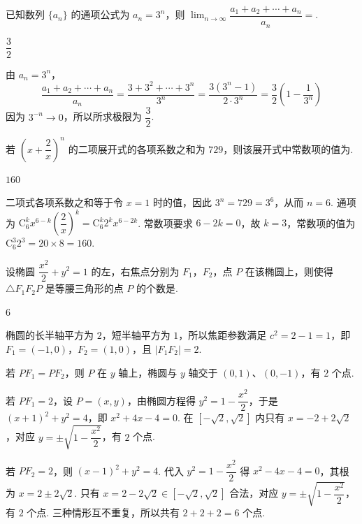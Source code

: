 \begin{problem}
已知数列 \(\{a_n\}\) 的通项公式为 \(a_n=3^n\)，则 \(\displaystyle\lim_{n\to\infty}\dfrac{a_1+a_2+\cdots+a_n}{a_n}=\)\fillinblank{}.
\end{problem}

\begin{answer}
\(\dfrac32\)
\end{answer}

\begin{solution}
由 \(a_n=3^n\)，
\[
\frac{a_1+a_2+\cdots+a_n}{a_n}=\frac{3+3^2+\cdots+3^n}{3^n}=\frac{3(3^n-1)}{2\cdot3^n}=\frac32\left(1-\frac1{3^n}\right)
\]
因为 \(3^{-n}\to0\)，所以所求极限为 \(\dfrac32\).
\end{solution}

\begin{problem}
若 \(\left(x+\dfrac{2}{x}\right)^n\) 的二项展开式的各项系数之和为 \(729\)，则该展开式中常数项的值为\fillinblank{}.
\end{problem}

\begin{answer}
\(160\)
\end{answer}

\begin{solution}
二项式各项系数之和等于令 \(x=1\) 时的值，因此 \(3^n=729=3^6\)，从而 \(n=6\). 通项为 \(\mathrm C_6^k x^{6-k}\left(\dfrac2x\right)^k=\mathrm C_6^k2^k x^{6-2k}\). 常数项要求 \(6-2k=0\)，故 \(k=3\)，常数项的值为 \(\mathrm C_6^3 2^3=20\times8=160\).
\end{solution}

\begin{problem}
设椭圆 \(\dfrac{x^2}{2}+y^2=1\) 的左，右焦点分别为 \(F_1\)，\(F_2\)，点 \(P\) 在该椭圆上，则使得 \(\triangle F_1F_2P\) 是等腰三角形的点 \(P\) 的个数是\fillinblank{}.
\end{problem}

\begin{answer}
\(6\)
\end{answer}

\begin{solution}
椭圆的长半轴平方为 \(2\)，短半轴平方为 \(1\)，所以焦距参数满足 \(c^2=2-1=1\)，即 \(F_1=(-1,0)\)，\(F_2=(1,0)\)，且 \(\lvert F_1F_2\rvert=2\).

若 \(PF_1=PF_2\)，则 \(P\) 在 \(y\) 轴上，椭圆与 \(y\) 轴交于 \((0,1)\)、\((0,-1)\)，有 \(2\) 个点.

若 \(PF_1=2\)，设 \(P=(x,y)\)，由椭圆方程得 \(y^2=1-\dfrac{x^2}{2}\)，于是 \((x+1)^2+y^2=4\)，即 \(x^2+4x-4=0\). 在 \([-\sqrt2,\sqrt2]\) 内只有 \(x=-2+2\sqrt2\)，对应 \(y=\pm\sqrt{1-\dfrac{x^2}{2}}\)，有 \(2\) 个点.

若 \(PF_2=2\)，则 \((x-1)^2+y^2=4\). 代入 \(y^2=1-\dfrac{x^2}{2}\) 得 \(x^2-4x-4=0\)，其根为 \(x=2\pm2\sqrt2\). 只有 \(x=2-2\sqrt2\in[-\sqrt2,\sqrt2]\) 合法，对应 \(y=\pm\sqrt{1-\dfrac{x^2}{2}}\)，有 \(2\) 个点. 三种情形互不重复，所以共有 \(2+2+2=6\) 个点.
\end{solution}

